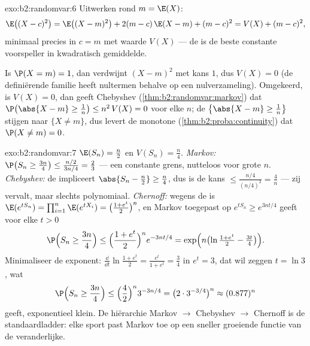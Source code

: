 \begin{solution}{exo:b2:randomvar:6}
Uitwerken rond $m = \E(X)$:
\[
\E\bigl((X - c)^2\bigr)
= \E\bigl((X - m)^2\bigr) + 2(m - c)\,\E(X - m) + (m - c)^2
= V(X) + (m - c)^2 ,
\]
minimaal precies in $c = m$ met waarde $V(X)$ --- de
 is de beste constante voorspeller in
kwadratisch gemiddelde.

Is $\P(X = m) = 1$, dan verdwijnt $(X - m)^2$ met kans $1$, dus
$V(X) = 0$ (de definiërende familie heeft nultermen behalve op een
nulverzameling). Omgekeerd, is $V(X) = 0$, dan geeft Chebyshev
(\cref{thm:b2:randomvar:markov}) dat $\P\bigl(\abs{X - m} \geq
\frac1n\bigr) \leq n^2\,V(X) = 0$ voor elke $n$; de 
$\bigl\{\abs{X - m} \geq \frac1n\bigr\}$ stijgen naar $\{X \neq
m\}$, dus levert de monotone 
(\cref{thm:b2:proba:continuity}) dat $\P(X \neq m) = 0$.
\end{solution}

\begin{solution}{exo:b2:randomvar:7}
$\E(S_n) = \frac n2$ en $V(S_n) = \frac n4$.
\emph{Markov:} $\P\bigl(S_n \geq \frac{3n}4\bigr) \leq
\frac{n/2}{3n/4} = \frac23$ --- een constante grens, nutteloos voor
grote $n$.
\emph{Chebyshev:} de  impliceert $\abs{S_n - \frac n2}
\geq \frac n4$, dus is de kans $\leq \frac{n/4}{(n/4)^2} =
\frac4n$ --- zij vervalt, maar slechts polynomiaal.
\emph{Chernoff:} wegens de  is $\E(e^{tS_n}) =
\prod_{i=1}^n\E(e^{tX_i}) = \bigl(\frac{1 + e^t}{2}\bigr)^n$, en
Markov toegepast op $e^{tS_n} \geq e^{3nt/4}$ geeft voor elke $t >
0$
\[
\P\Bigl(S_n \geq \frac{3n}4\Bigr)
\leq \Bigl(\frac{1 + e^t}{2}\Bigr)^n e^{-3nt/4}
= \exp\Bigl(n\bigl(\ln\tfrac{1 + e^t}{2} - \tfrac{3t}4\bigr)\Bigr).
\]
Minimaliseer de exponent: $\frac{\dd}{\dd t}\ln\frac{1+e^t}{2} =
\frac{e^t}{1 + e^t} = \frac34$ in $e^t = 3$, dat wil zeggen $t =
\ln 3$, wat
\[
\P\Bigl(S_n \geq \frac{3n}4\Bigr)
\leq \Bigl(\frac{4}{2}\Bigr)^n 3^{-3n/4}
= \bigl(2 \cdot 3^{-3/4}\bigr)^n \approx (0.877)^n
\]
geeft, exponentieel klein. De hiërarchie Markov $\to$ Chebyshev
$\to$ Chernoff is de standaardladder: elke sport past Markov toe op
een sneller groeiende functie van de veranderlijke.
\end{solution}

